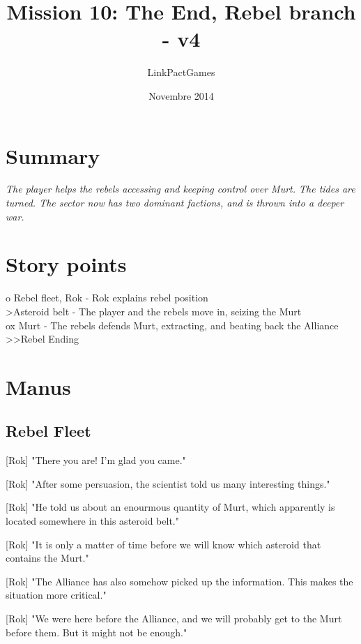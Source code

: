 \documentclass[a4paper,12pt]{article}
\begin{document}
\title{Mission 10: The End, Rebel branch - v4}
\author{LinkPactGames}
\date{Novembre 2014}
\maketitle

\section{Summary}

\textit{The player helps the rebels accessing and keeping control over Murt. The tides are turned.
The sector now has two dominant factions, and is thrown into a deeper war.}

\section{Story points}

o Rebel fleet, Rok - Rok explains rebel position\\
\textgreater Asteroid belt - The player and the rebels move in, seizing the Murt\\
ox Murt - The rebels defends Murt, extracting, and beating back the Alliance\\
\textgreater \textgreater Rebel Ending

\section{Manus}

\subsection{Rebel Fleet}

[Rok] "There you are! I'm glad you came."

[Rok] "After some persuasion, the scientist told us many interesting things."

[Rok] "He told us about an enourmous quantity of Murt, which apparently is located somewhere in this asteroid belt."

[Rok] "It is only a matter of time before we will know which asteroid that contains the Murt."

[Rok] "The Alliance has also somehow picked up the information. This makes the situation more critical."

[Rok] "We were here before the Alliance, and we will probably get to the Murt before them. But it might not be enough."
\end{document}
